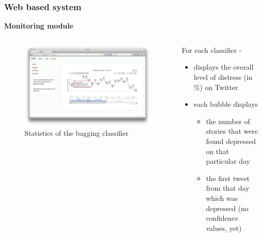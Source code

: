 \documentclass{beamer}
\begin{document}
    \begin{frame}
        \frametitle{Web based system}
        \begin{center}
            \textbf{Monitoring module}
        \end{center}
        \begin{columns}
            \begin{column}{0.5\textwidth}
                \begin{figure}
                    \centering
                    \includegraphics[width=\textwidth]{figures/monitoring_bagging_tweet_info.png}
                    \caption{Statistics of the bagging classifier}
                \end{figure}
            \end{column}
            \begin{column}{0.5\textwidth}
                For each classifier -
                \begin{itemize}
                    \item{displays the overall level of distress (in \%) on Twitter}
                    \item{
                    each bubble displays
                    \begin{itemize}
                        \item{the number of stories that were found depressed on that particular day}
                        \item{the first tweet from that day which was depressed (no confidence values, yet)}
                    \end{itemize}
                    }
                \end{itemize}
            \end{column}
        \end{columns}
    \end{frame}
    
\end{document}
